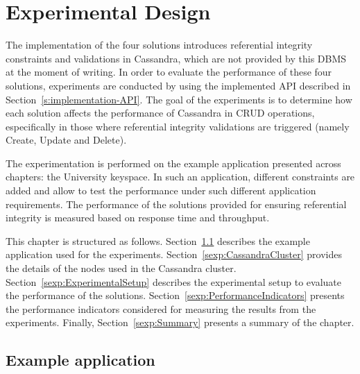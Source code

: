 \chapter{Experimental Design}

The implementation of the four solutions  introduces referential integrity
constraints and validations in Cassandra, which are 
not provided by this \ac{DBMS} at the moment of writing. In order to evaluate
 the performance of these four solutions, experiments are 
  conducted by using the implemented \ac{API} described in
  Section~\ref{s:implementation-API}.   The goal of the experiments is to determine how
  each solution affects the performance of  Cassandra in \ac{CRUD}
  operations, especifically in those where referential integrity validations are
  triggered (namely Create, Update and Delete).

The experimentation is performed on the example application presented across
chapters: the University keyspace. In such an application, different constraints
are added and allow to test the performance under such different application
requirements. The performance of the  solutions provided for ensuring
referential integrity  is measured based on response time and throughput.

This chapter is structured as follows.
Section~\ref{sexp:BenchmarkKeyspace} describes the example application 
used for the experiments. Section~\ref{sexp:CassandraCluster} provides the
details of the nodes used in the Cassandra cluster. Section~\ref{sexp:ExperimentalSetup}
describes the experimental setup to evaluate the performance of the solutions.
Section~\ref{sexp:PerformanceIndicators} presents the performance indicators
 considered for measuring the results from the experiments. Finally,
Section~\ref{sexp:Summary} presents a summary of the chapter.


\section{Example application} \label{sexp:BenchmarkKeyspace}

